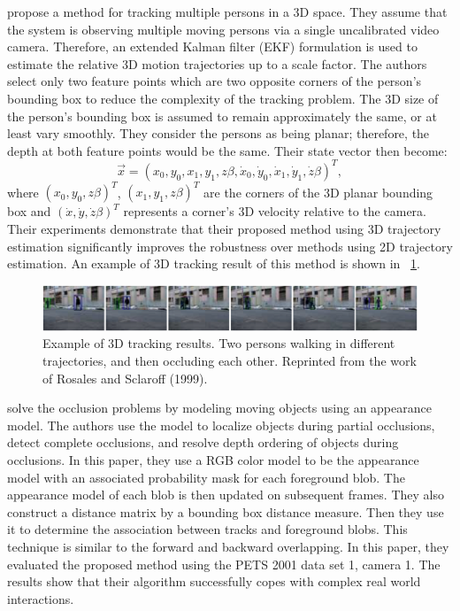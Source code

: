  propose a method for tracking
multiple persons in a 3D space. They assume that the system is
observing multiple moving persons via a single uncalibrated video
camera. Therefore, an extended Kalman filter (EKF) formulation is used
to estimate the relative 3D motion trajectories up to a scale
factor. The authors select only two feature points which are two
opposite corners of the person's bounding box to reduce the complexity
of the tracking problem. The 3D size of the person's bounding box is
assumed to remain approximately the same, or at least vary
smoothly. They consider the persons as being planar; therefore, the
depth at both feature points would be the same. Their state vector
then become:
\[
  \vec{x} = (x_0 ,y_0 ,x_1 ,y_1 ,z\beta ,\dot x_0 ,\dot y_0
  ,\dot x_1 ,\dot y_1 ,\dot z\beta )^T,
\]
where $(x_0, y_0, z\beta)^T$, $(x_1, y_1, z\beta)^T$ are the corners
of the 3D planar bounding box and $(\dot x, \dot y, \dot z\beta)^T$
represents a corner's 3D velocity relative to the camera. Their
experiments demonstrate that their proposed method using 3D trajectory
estimation significantly improves the robustness over methods using 2D
trajectory estimation. An example of 3D tracking result of this method
is shown in \figurename~\ref{fig:rosales-tracking-result}.

\begin{figure}[t]
  \centering
  \includegraphics[width=6in]{figures/rosales-tracking-result.png}
  \caption[Example of 3D tracking results]{Example of 3D tracking
  results. Two persons walking in different trajectories, and then
  occluding each other. Reprinted from the work of Rosales and
  Sclaroff (1999).}
  \label{fig:rosales-tracking-result}
\end{figure}

 solve the occlusion problems by
modeling moving objects using an appearance model. The authors use the
model to localize objects during partial occlusions, detect complete
occlusions, and resolve depth ordering of objects during
occlusions. In this paper, they use a RGB color model to be the
appearance model with an associated probability mask for each
foreground blob. The appearance model of each blob is then updated on
subsequent frames. They also construct a distance matrix by a bounding
box distance measure. Then they use it to determine the association
between tracks and foreground blobs. This technique is similar to the
forward and backward overlapping. In this paper, they evaluated the
proposed method using the PETS 2001 data set 1, camera 1. The results
show that their algorithm successfully copes with complex real world
interactions.

